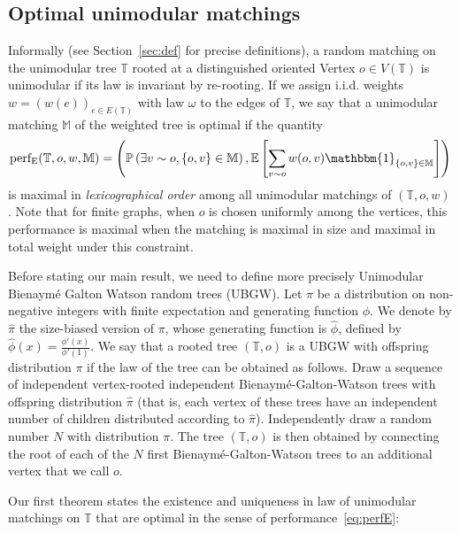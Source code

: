 \documentclass[11pt]{article}
\DeclareMathOperator{\perfE}{perf_E}
\begin{document}
\subsection{Optimal unimodular matchings}
Informally (see Section~\ref{sec:def} for precise definitions), a random matching on the unimodular tree $\mathbb T$ rooted at a distinguished oriented Vertex $o \in V(\mathbb{T})$ is unimodular if its law is invariant by re-rooting. If we assign  i.i.d. weights $w=(w(e))_{e\in E(\mathbb T)}$ with law $\omega$ to the edges of $\mathbb T$, we say that a unimodular matching $\mathbb M$ of the weighted tree is optimal if the quantity 
\begin{equation}
    \label{eq:perfE}
    \perfE(\mathbb{T},o,w,\mathbb{M})=\left( \mathbb{P}\left( \exists v \sim o, \{o,v\} \in \mathbb{M}\right),\mathbb{E}\left[ \sum_{v\sim o}w(o,v)\mathbbm{1}_{\{o,v\} \in \mathbb{M}}\right]\right)
\end{equation}
is maximal in \emph{lexicographical order} among all unimodular matchings of $(\mathbb T, o, w)$. Note that for finite graphs, when $o$ is chosen uniformly among the vertices, this performance is maximal when the matching is maximal in size and maximal in total weight under this constraint.

Before stating our main result, we need to define more precisely Unimodular Bienaymé Galton Watson random trees (UBGW). Let $\pi$ be a distribution on non-negative integers with finite expectation and generating function $\phi$. We denote by $\hat{\pi}$ the size-biased version of $\pi$, whose generating function is $\hat \phi$, defined by $\hat \phi(x) = \frac{\phi'(x)}{\phi'(1)}$. We say that a rooted tree $(\mathbb{T},o)$ is a UBGW with offspring distribution $\pi$ if the law of the tree can be obtained as follows. Draw a sequence of independent vertex-rooted independent Bienaymé-Galton-Watson trees with offspring distribution $\hat{\pi}$ (that is, each vertex of these trees have an independent number of children distributed according to $\hat \pi$). Independently draw a random number $N$ with distribution $\pi$.  The tree $(\mathbb{T},o)$ is then obtained by connecting the root of each of the $N$ first Bienaymé-Galton-Watson trees to an additional vertex that we call $o$. 


Our first theorem states the existence and uniqueness in law of unimodular matchings on $\mathbb{T}$ that are optimal in the sense of performance~\eqref{eq:perfE}:
\end{document}
